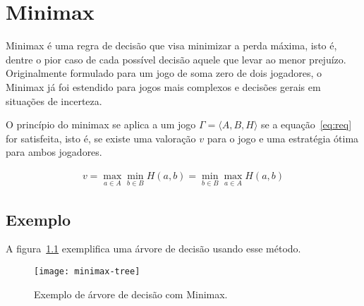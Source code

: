 \chapter{Minimax}

Minimax é uma regra de decisão que visa minimizar a perda máxima, isto é, dentre
o pior caso de cada possível decisão aquele que levar ao menor prejuízo.
Originalmente formulado para um jogo de soma zero de dois jogadores, o Minimax
já foi estendido para jogos mais complexos e decisões gerais em situações de
incerteza.

O princípio do minimax se aplica a um jogo $\Gamma=\langle A,B,H\rangle$ se a
equação~\ref{eq:req} for satisfeita, isto é, se existe uma valoração $v$ para o
jogo e uma estratégia ótima para ambos jogadores.
\cite{hazewinkel2002encyclopaedia}

\begin{gather}
  v=\max_{a\in A}\min_{b\in B}H(a,b)=\min_{b\in B}\max_{a\in A}H(a,b)\label{eq:req}
\end{gather}

\section{Exemplo}

A figura~\ref{fig:minimax-tree} exemplifica uma árvore de decisão usando esse
método.

\begin{figure}[ht]
  \centering
  \texttt{[image: minimax-tree]}
  \caption{Exemplo de árvore de decisão com Minimax.}\label{fig:minimax-tree}
\end{figure}

